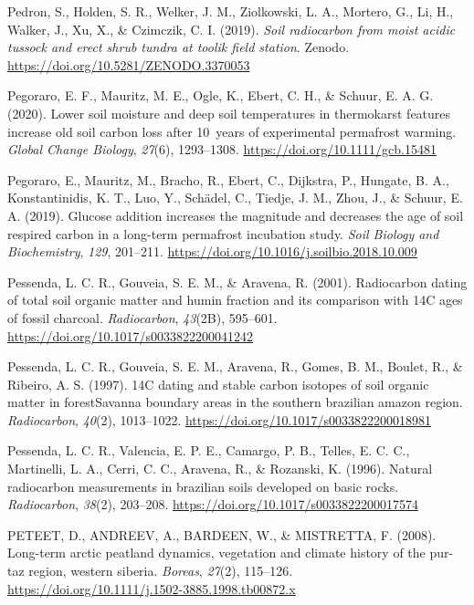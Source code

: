 \documentclass[]{article}
\begin{document}
\leavevmode\hypertarget{ref-https:ux2fux2fdoi.orgux2f10.5281ux2fzenodo.3370053}{}%
Pedron, S., Holden, S. R., Welker, J. M., Ziolkowski, L. A., Mortero,
G., Li, H., Walker, J., Xu, X., \& Czimczik, C. I. (2019). \emph{Soil
radiocarbon from moist acidic tussock and erect shrub tundra at toolik
field station}. Zenodo. \url{https://doi.org/10.5281/ZENODO.3370053}

\leavevmode\hypertarget{ref-Pegoraro_2020}{}%
Pegoraro, E. F., Mauritz, M. E., Ogle, K., Ebert, C. H., \& Schuur, E.
A. G. (2020). Lower soil moisture and deep soil temperatures in
thermokarst features increase old soil carbon loss after 10~years of
experimental permafrost warming. \emph{Global Change Biology},
\emph{27}(6), 1293--1308. \url{https://doi.org/10.1111/gcb.15481}

\leavevmode\hypertarget{ref-Pegoraro_2019}{}%
Pegoraro, E., Mauritz, M., Bracho, R., Ebert, C., Dijkstra, P., Hungate,
B. A., Konstantinidis, K. T., Luo, Y., Schädel, C., Tiedje, J. M., Zhou,
J., \& Schuur, E. A. (2019). Glucose addition increases the magnitude
and decreases the age of soil respired carbon in a long-term permafrost
incubation study. \emph{Soil Biology and Biochemistry}, \emph{129},
201--211. \url{https://doi.org/10.1016/j.soilbio.2018.10.009}

\leavevmode\hypertarget{ref-Pessenda_2001}{}%
Pessenda, L. C. R., Gouveia, S. E. M., \& Aravena, R. (2001).
Radiocarbon dating of total soil organic matter and humin fraction and
its comparison with 14C ages of fossil charcoal. \emph{Radiocarbon},
\emph{43}(2B), 595--601. \url{https://doi.org/10.1017/s0033822200041242}

\leavevmode\hypertarget{ref-Pessenda_1997}{}%
Pessenda, L. C. R., Gouveia, S. E. M., Aravena, R., Gomes, B. M.,
Boulet, R., \& Ribeiro, A. S. (1997). 14C dating and stable carbon
isotopes of soil organic matter in forestSavanna boundary areas in the
southern brazilian amazon region. \emph{Radiocarbon}, \emph{40}(2),
1013--1022. \url{https://doi.org/10.1017/s0033822200018981}

\leavevmode\hypertarget{ref-Pessenda_1996}{}%
Pessenda, L. C. R., Valencia, E. P. E., Camargo, P. B., Telles, E. C.
C., Martinelli, L. A., Cerri, C. C., Aravena, R., \& Rozanski, K.
(1996). Natural radiocarbon measurements in brazilian soils developed on
basic rocks. \emph{Radiocarbon}, \emph{38}(2), 203--208.
\url{https://doi.org/10.1017/s0033822200017574}

\leavevmode\hypertarget{ref-PETEET_2008}{}%
PETEET, D., ANDREEV, A., BARDEEN, W., \& MISTRETTA, F. (2008). Long-term
arctic peatland dynamics, vegetation and climate history of the pur-taz
region, western siberia. \emph{Boreas}, \emph{27}(2), 115--126.
\url{https://doi.org/10.1111/j.1502-3885.1998.tb00872.x}
\end{document}
